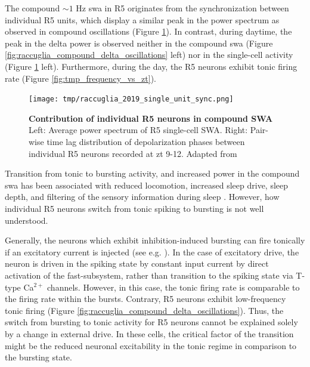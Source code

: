 \documentclass[../main.tex]{subfiles}
\begin{document}
The compound $\sim 1$ Hz \gls{swa} in R5 originates from the synchronization between individual R5 units, which display a similar peak in the power spectrum as observed in compound oscillations \parencite{raccugliaNetworkSpecificSynchronizationElectrical2019} (Figure \ref{fig:tmp_single_unit_r5_day_night}).
In contrast, during daytime, the peak in the delta power is observed neither in the compound \gls{swa} (Figure \ref{fig:raccuglia_compound_delta_oscillations} left) nor in the single-cell activity (Figure \ref{fig:tmp_single_unit_r5_day_night} left).
Furthermore, during the day, the R5 neurons exhibit tonic firing rate (Figure \ref{fig:tmp_frequency_vs_zt}).

\begin{figure}[!t]
    \centering
    \texttt{[image: tmp/raccuglia\_2019\_single\_unit\_sync.png]}
    \caption[Contribution of individual R5 neurons in compound SWA]{
        \textbf{Contribution of individual R5 neurons in compound SWA}
        Left: Average power spectrum of R5 single-cell SWA.
        Right: Pair-wise time lag distribution of depolarization phases between individual R5 neurons recorded at \gls{zt} 9-12.
        Adapted from \parencite{raccugliaNetworkSpecificSynchronizationElectrical2019}
    }
    \label{fig:tmp_single_unit_r5_day_night}
\end{figure}

Transition from tonic to bursting activity, and increased power in the compound \gls{swa} has been associated with reduced locomotion, increased sleep drive, sleep depth, and filtering of the sensory information during sleep
\parencite{liuSleepDriveEncoded2016,raccugliaNetworkSpecificSynchronizationElectrical2019,
raccugliaCoherentMultilevelNetwork2022,suarez-grimaltNeuralArchitectureSleep2021}.
However, how individual R5 neurons switch from tonic spiking to bursting is not well understood.

Generally, the neurons which exhibit inhibition-induced bursting can fire tonically if an excitatory current is injected (see e.g. \parencite{wangMultipleDynamicalModes1994}).
In the case of excitatory drive, the neuron is driven in the spiking state by constant input current by direct activation of the fast-subsystem, rather than transition to the spiking state via T-type Ca$^{2+}$ channels. However, in this case, the tonic firing rate is comparable to the firing rate within the bursts. Contrary, R5 neurons exhibit low-frequency tonic firing \parencite{raccugliaNetworkSpecificSynchronizationElectrical2019} (Figure \ref{fig:raccuglia_compound_delta_oscillations}).
Thus, the switch from bursting to tonic activity for R5 neurons cannot be explained solely by a change in external drive. In these cells, the critical factor of the transition might be the reduced neuronal excitability in the tonic regime in comparison to the bursting state.
\end{document}
